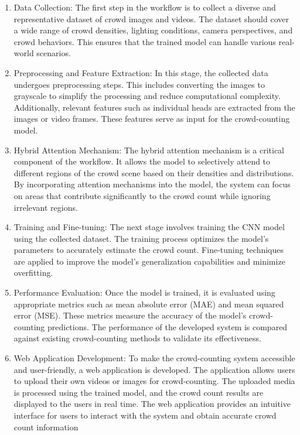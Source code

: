 \documentclass[12pt]{report}
\begin{document}
\begin{enumerate}
\item Data Collection: The first step in the workflow is to collect a diverse and representative dataset of crowd images and videos. The dataset should cover a wide range of crowd densities, lighting conditions, camera perspectives, and crowd behaviors. This ensures that the trained model can handle various real-world scenarios.
\item Preprocessing and Feature Extraction: In this stage, the collected data undergoes preprocessing steps. This includes converting the images to grayscale to simplify the processing and reduce computational complexity. Additionally, relevant features such as individual heads are extracted from the images or video frames. These features serve as input for the crowd-counting model.
\item Hybrid Attention Mechanism: The hybrid attention mechanism is a critical component of the workflow. It allows the model to selectively attend to different regions of the crowd scene based on their densities and distributions. By incorporating attention mechanisms into the model, the system can focus on areas that contribute significantly to the crowd count while ignoring irrelevant regions.
\item Training and Fine-tuning: The next stage involves training the CNN model using the collected dataset. The training process optimizes the model's parameters to accurately estimate the crowd count. Fine-tuning techniques are applied to improve the model's generalization capabilities and minimize overfitting.
\item Performance Evaluation: Once the model is trained, it is evaluated using appropriate metrics such as mean absolute error (MAE) and mean squared error (MSE). These metrics measure the accuracy of the model's crowd-counting predictions. The performance of the developed system is compared against existing crowd-counting methods to validate its effectiveness.
\item Web Application Development: To make the crowd-counting system accessible and user-friendly, a web application is developed. The application allows users to upload their own videos or images for crowd-counting. The uploaded media is processed using the trained model, and the crowd count results are displayed to the users in real time. The web application provides an intuitive interface for users to interact with the system and obtain accurate crowd count information
\end{enumerate}
\end{document}
